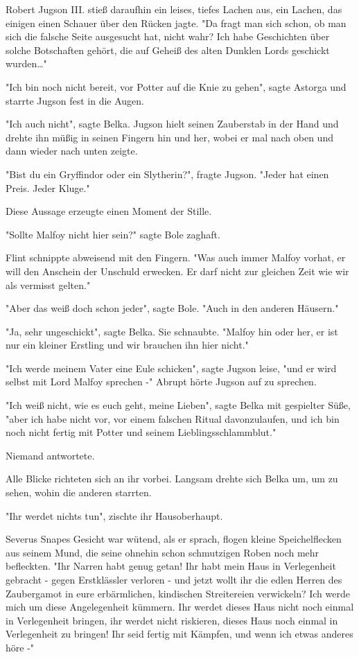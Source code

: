 {Robert Jugson III. stieß daraufhin ein leises, tiefes Lachen aus, ein Lachen, das einigen einen Schauer über den Rücken jagte. "Da fragt man sich schon, ob man sich die falsche Seite ausgesucht hat, nicht wahr? Ich habe Geschichten über solche Botschaften gehört, die auf Geheiß des alten Dunklen Lords geschickt wurden…"

"Ich bin noch nicht bereit, vor Potter auf die Knie zu gehen", sagte Astorga und starrte Jugson fest in die Augen.

"Ich auch nicht", sagte Belka. Jugson hielt seinen Zauberstab in der Hand und drehte ihn müßig in seinen Fingern hin und her, wobei er mal nach oben und dann wieder nach unten zeigte.

"Bist du ein Gryffindor oder ein Slytherin?", fragte Jugson. "Jeder hat einen Preis. Jeder Kluge."

Diese Aussage erzeugte einen Moment der Stille.

"Sollte Malfoy nicht hier sein?" sagte Bole zaghaft.

Flint schnippte abweisend mit den Fingern. "Was auch immer Malfoy vorhat, er will den Anschein der Unschuld erwecken. Er darf nicht zur gleichen Zeit wie wir als vermisst gelten."

"Aber das weiß doch schon jeder", sagte Bole. "Auch in den anderen Häusern."

"Ja, sehr ungeschickt", sagte Belka. Sie schnaubte. "Malfoy hin oder her, er ist nur ein kleiner Erstling und wir brauchen ihn hier nicht."

"Ich werde meinem Vater eine Eule schicken", sagte Jugson leise, "und er wird selbst mit Lord Malfoy sprechen -" Abrupt hörte Jugson auf zu sprechen.

"Ich weiß nicht, wie es euch geht, meine Lieben", sagte Belka mit gespielter Süße, "aber ich habe nicht vor, vor einem falschen Ritual davonzulaufen, und ich bin noch nicht fertig mit Potter und seinem Lieblingsschlammblut."

Niemand antwortete.

Alle Blicke richteten sich an ihr vorbei. Langsam drehte sich Belka um, um zu sehen, wohin die anderen starrten.

"Ihr werdet nichts tun", zischte ihr Hausoberhaupt.

Severus Snapes Gesicht war wütend, als er sprach, flogen kleine Speichelflecken aus seinem Mund, die seine ohnehin schon schmutzigen Roben noch mehr befleckten. "Ihr Narren habt genug getan! Ihr habt mein Haus in Verlegenheit gebracht - gegen Erstklässler verloren - und jetzt wollt ihr die edlen Herren des Zaubergamot in eure erbärmlichen, kindischen Streitereien verwickeln? Ich werde mich um diese Angelegenheit kümmern. Ihr werdet dieses Haus nicht noch einmal in Verlegenheit bringen, ihr werdet nicht riskieren, dieses Haus noch einmal in Verlegenheit zu bringen! Ihr seid fertig mit Kämpfen, und wenn ich etwas anderes höre -"

}
